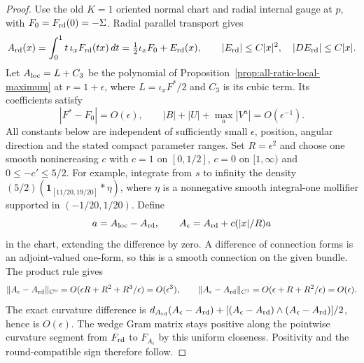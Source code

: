 \documentclass[11pt]{article}
\numberwithin{equation}{section}
\theoremstyle{definition}
\theoremstyle{remark}
\begin{document}
\begin{proof}
Use the old $K=1$ oriented normal chart and radial internal
gauge at $p$, with $F_0=F_{\rm rd}(0)=-\Sigma$. Radial
parallel transport gives
\[
 A_{\rm rd}(x)=\int_0^1t\,\iota_xF_{\rm rd}(tx)\,dt
             =\tfrac12\iota_xF_0+E_{\rm rd}(x),
 \qquad |E_{\rm rd}|\le C|x|^2,\quad |DE_{\rm rd}|\le C|x|.
\]
Let $A_{\rm loc}=L+C_3$ be the polynomial of
Proposition~\ref{prop:all-ratio-local-maximum} at
$r=1+\epsilon$, where $L=\iota_xF^*/2$ and $C_3$ is
its cubic term. Its coefficients satisfy
\[
 |F^*-F_0|=O(\epsilon),\qquad
 |B|+|U|+\max_a|V^a|=O(\epsilon^{-1}).
\]
All constants below are independent of sufficiently small
$\epsilon$, position, angular direction and the stated
compact parameter ranges. Set $R=\epsilon^2$ and choose
one smooth nonincreasing $c$ with $c=1$ on $[0,1/2]$,
$c=0$ on $[1,\infty)$ and $0\le-c'\le5/2$. For example,
integrate from $s$ to infinity the density
$(5/2)(\mathbf 1_{[11/20,19/20]}*\eta)$, where $\eta$
is a nonnegative smooth integral-one mollifier supported
in $(-1/20,1/20)$. Define
\[
 a=A_{\rm loc}-A_{\rm rd},\qquad
 A_\epsilon=A_{\rm rd}+c(|x|/R)a
\]
in the chart, extending the difference by zero. A difference
of connection forms is an adjoint-valued one-form, so this
is a smooth connection on the given bundle. The product rule gives
\[
 \|A_\epsilon-A_{\rm rd}\|_{C^0}=O(\epsilon R+R^2+R^3/\epsilon)
          =O(\epsilon^3),\qquad
 \|A_\epsilon-A_{\rm rd}\|_{C^1}
          =O(\epsilon+R+R^2/\epsilon)=O(\epsilon).
\]
The exact curvature difference is
$d_{A_{\rm rd}}(A_\epsilon-A_{\rm rd})+
[(A_\epsilon-A_{\rm rd})\wedge(A_\epsilon-A_{\rm rd})]/2$,
hence is $O(\epsilon)$. The wedge Gram matrix stays positive along the pointwise
curvature segment from $F_{\rm rd}$ to $F_{A_\epsilon}$
by this uniform closeness. Positivity and the round-compatible
sign therefore follow.


\end{proof}
\end{document}
